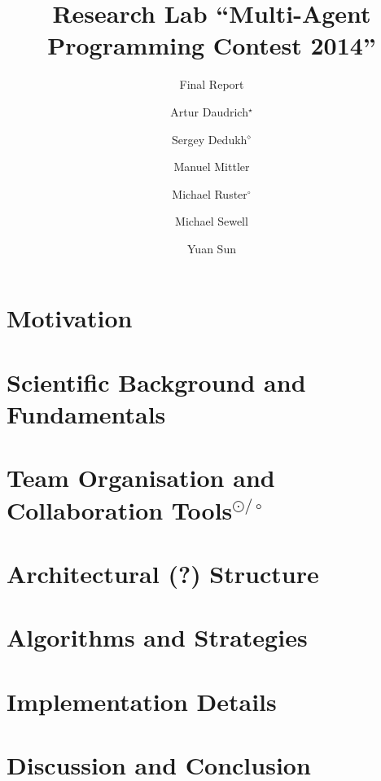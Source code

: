 \documentclass{../tech_reports/template/llncs}
\title{Research Lab \enquote{Multi-Agent Programming Contest 2014}}
\subtitle{Final Report}
\author{Artur Daudrich$^\star$ \and Sergey Dedukh$^\diamond$ \and Manuel Mittler \and Michael Ruster$^\circ$ \and Michael Sewell \and Yuan Sun}
\institute{University of Koblenz-Landau, Koblenz Campus}
\begin{document}
\maketitle

\tableofcontents
\clearpage
{}

\section{Motivation}


\section{Scientific Background and Fundamentals}


\section[Team Organisation and Collaboration Tools]{Team Organisation and Collaboration Tools$^{\odot/\circ}$}


\section{Architectural (?) Structure}


\section{Algorithms and Strategies}


\section{Implementation Details}


\section{Discussion and Conclusion}


%
%
\printbibliography
\end{document}
